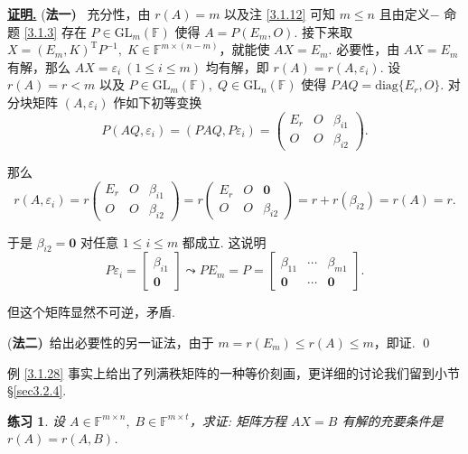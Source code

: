 \documentclass[10pt,openany]{article}
\theoremstyle{thmstyle} %
\newtheorem{practice}{练习}[section]
\theoremstyle{defstyle} %
\theoremstyle{prostyle} %
\theoremstyle{exastyle}
\theoremstyle{remstyle}
\renewenvironment{proof}[1][证明]{\par\underline{\textbf{#1.}} \;\fangsong}{\qed\par}
\newcommand{\T}{^{\text{T}}}
\newcommand{\F}{\mathbb{F}}
\newcommand{\gfn}{\text{GL}_n(\mathbb{F})}
\newcommand{\gfm}{\text{GL}_m(\mathbb{F})}
\newcommand{\mn}{^{m \times n}}
\newcommand{\diag}{\mathrm{diag}}
\begin{document}
\begin{proof}
	(\textbf{法一)} \ 充分性，由 \( r(A)=m \) 以及注 \ref{3.1.12} 可知 \( m \leq n \) 且由定义\(-\) 命题 \ref{3.1.3} 存在 \( P \in \gfm \) 使得 \( A=P(E_m,O) \). 接下来取 \( X=(E_m,K)\T P^{-1}, \; K \in \F^{m \times (n-m)} \)，就能使 \( AX=E_m \). 必要性，由 \( AX = E_m \) 有解，那么 \( AX=\varepsilon_i \ (1 \leq i \leq m ) \) 均有解，即 \( r(A)=r(A,\varepsilon_i) \). 设 \( r(A)=r < m \) 以及 \( P \in \gfm, \; Q \in \gfn  \) 使得 \( PAQ=\diag\{E_r,O\} \). 对分块矩阵 \( (A,\varepsilon_i) \) 作如下初等变换
	\[ P(AQ,\varepsilon_i)=(PAQ,P\varepsilon_i)= \begin{pmatrix}
		E_r & O & \beta_{i1} \\
		O & O & \beta_{i2}
	\end{pmatrix}. \] 
	
	那么
	\[ r(A,\varepsilon_i)=r\begin{pmatrix}
		E_r & O & \beta_{i1} \\
		O & O & \beta_{i2}
	\end{pmatrix}=r\begin{pmatrix}
		E_r & O & \bm{0} \\
		O & O & \beta_{i2}
	\end{pmatrix}=r+r(\beta_{i2})=r(A)=r. \]
	
	于是 \( \beta_{i2}=\bm{0} \) 对任意 \( 1 \leq i \leq m \) 都成立. 这说明
	\[ P\varepsilon_i=\begin{bmatrix}
		\beta_{i1} \\ \bm{0}
	\end{bmatrix} \leadsto PE_m=P=\begin{bmatrix}
	 \beta_{11} & \cdots & \beta_{m1} \\
	 \bm{0} & \cdots & \bm{0}
	\end{bmatrix}. \]
	
	但这个矩阵显然不可逆，矛盾.
    
    \vspace{1ex}
    
    (\textbf{法二)}\ 给出必要性的另一证法，由于 \( m=r(E_m) \leq r(A) \leq m \)，即证. 
\end{proof}

例 \ref{3.1.28} 事实上给出了列满秩矩阵的一种等价刻画，更详细的讨论我们留到小节 \S \ref{sec3.2.4}.

\begin{practice}
	设 \( A \in \F\mn, \; B \in \F^{m \times t} \)，求证: 矩阵方程 \( AX = B \) 有解的充要条件是 \( r(A) = r(A,B) \).
\end{practice}
\end{document}
